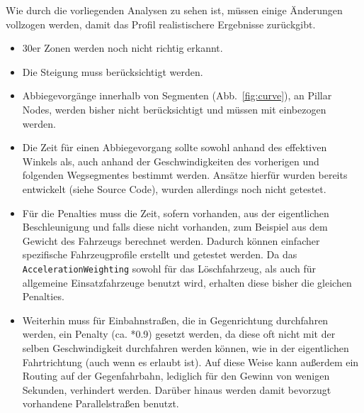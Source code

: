 Wie durch die vorliegenden Analysen zu sehen ist, müssen einige Änderungen vollzogen werden, damit das Profil realistischere Ergebnisse zurückgibt.\par
\begin{itemize}
\item 30er Zonen werden noch nicht richtig erkannt.
\item Die Steigung muss berücksichtigt werden.
\item Abbiegevorgänge innerhalb von Segmenten (Abb.~\ref{fig:curve}), an Pillar Nodes, werden bisher nicht berücksichtigt und müssen mit einbezogen werden.
\item Die Zeit für einen Abbiegevorgang sollte sowohl anhand des effektiven Winkels als, auch anhand der Geschwindigkeiten des vorherigen und folgenden Wegsegmentes bestimmt werden.
Ansätze hierfür wurden bereits entwickelt (siehe Source Code), wurden allerdings noch nicht getestet.
\item Für die Penalties muss die Zeit, sofern vorhanden, aus der eigentlichen Beschleunigung und falls diese nicht vorhanden, zum Beispiel aus dem Gewicht des Fahrzeugs berechnet werden.
Dadurch können einfacher spezifische Fahrzeugprofile erstellt und getestet werden.
Da das \texttt{AccelerationWeighting} sowohl für das Löschfahrzeug, als auch für allgemeine Einsatzfahrzeuge benutzt wird, erhalten diese bisher die gleichen Penalties.
\item Weiterhin muss für Einbahnstraßen, die in Gegenrichtung durchfahren werden, ein Penalty (ca. *0.9) gesetzt werden, da diese oft nicht mit der selben Geschwindigkeit durchfahren werden können, wie in der eigentlichen Fahrtrichtung (auch wenn es erlaubt ist).
Auf diese Weise kann außerdem ein Routing auf der Gegenfahrbahn, lediglich für den Gewinn von wenigen Sekunden, verhindert werden.
Darüber hinaus werden damit bevorzugt vorhandene Parallelstraßen benutzt.
\end{itemize}